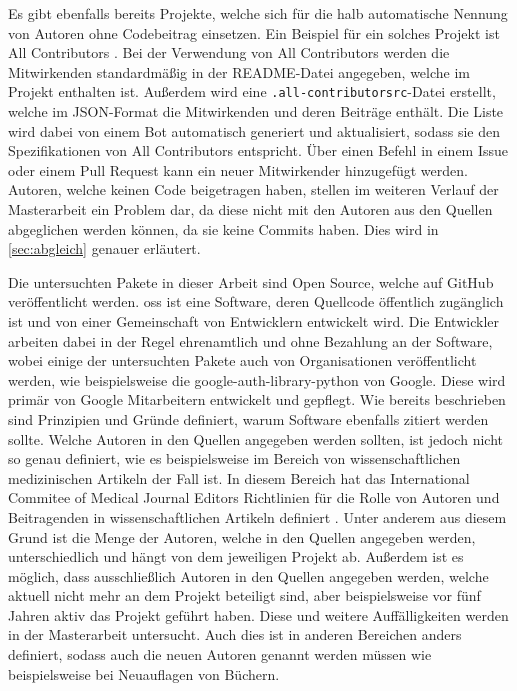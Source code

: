 Es gibt ebenfalls bereits Projekte, welche sich für die halb automatische Nennung von Autoren ohne Codebeitrag einsetzen.
Ein Beispiel für ein solches Projekt ist \glqq All Contributors\grqq{} \autocite{all_contributors_recognize_2024}.
Bei der Verwendung von \glqq All Contributors\grqq{} werden die Mitwirkenden standardmäßig in der README-Datei angegeben, welche im Projekt enthalten ist.
Außerdem wird eine \texttt{.all-contributorsrc}-Datei erstellt, welche im JSON-Format die Mitwirkenden und deren Beiträge enthält.
Die Liste wird dabei von einem Bot automatisch generiert und aktualisiert, sodass sie den Spezifikationen von \glqq All Contributors\grqq{} entspricht.
Über einen Befehl in einem Issue oder einem Pull Request kann ein neuer Mitwirkender hinzugefügt werden.
Autoren, welche keinen Code beigetragen haben, stellen im weiteren Verlauf der Masterarbeit ein Problem dar, da diese nicht mit den Autoren aus den Quellen abgeglichen werden können, da sie keine Commits haben.
Dies wird in \autoref{sec:abgleich} genauer erläutert.

Die untersuchten Pakete in dieser Arbeit sind Open Source, welche auf GitHub veröffentlicht werden.
\gls{oss} ist eine Software, deren Quellcode öffentlich zugänglich ist und von einer Gemeinschaft von Entwicklern entwickelt wird.
Die Entwickler arbeiten dabei in der Regel ehrenamtlich und ohne Bezahlung an der Software, wobei einige der untersuchten Pakete auch von Organisationen veröffentlicht werden, wie beispielsweise die \glqq google-auth-library-python
\grqq{} von Google.
Diese wird primär von Google Mitarbeitern entwickelt und gepflegt.
Wie bereits beschrieben sind Prinzipien und Gründe definiert, warum Software ebenfalls zitiert werden sollte.
Welche Autoren in den Quellen angegeben werden sollten, ist jedoch nicht so genau definiert, wie es beispielsweise im Bereich von wissenschaftlichen medizinischen Artikeln der Fall ist.
In diesem Bereich hat das \glqq International Commitee of Medical Journal Editors\grqq{} Richtlinien für die Rolle von Autoren und Beitragenden in wissenschaftlichen Artikeln definiert \autocite{noauthor_icmje_nodate}.
Unter anderem aus diesem Grund ist die Menge der Autoren, welche in den Quellen angegeben werden, unterschiedlich und hängt von dem jeweiligen Projekt ab.
Außerdem ist es möglich, dass ausschließlich Autoren in den Quellen angegeben werden, welche aktuell nicht mehr an dem Projekt beteiligt sind, aber beispielsweise vor fünf Jahren aktiv das Projekt geführt haben.
Diese und weitere Auffälligkeiten werden in der Masterarbeit untersucht.
Auch dies ist in anderen Bereichen anders definiert, sodass auch die neuen Autoren genannt werden müssen wie beispielsweise bei Neuauflagen von Büchern.
